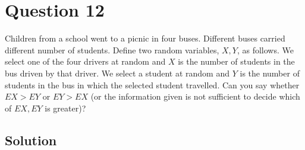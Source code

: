 \section*{Question 12}

Children from a school went to a picnic in four buses.
Different buses carried different number of students.
Define two random variables, \( X, Y \), as follows.
We select one of the four drivers at random and \( X \) is the number of students in the bus driven by that driver.
We select a student at random and \( Y \) is the number of students in the bus in which the selected student travelled.
Can you say whether \( E X > E Y \) or \( E Y > E X \) (or the information given is not sufficient to decide which of \( E X, E Y \) is greater)?

\subsection*{Solution}
